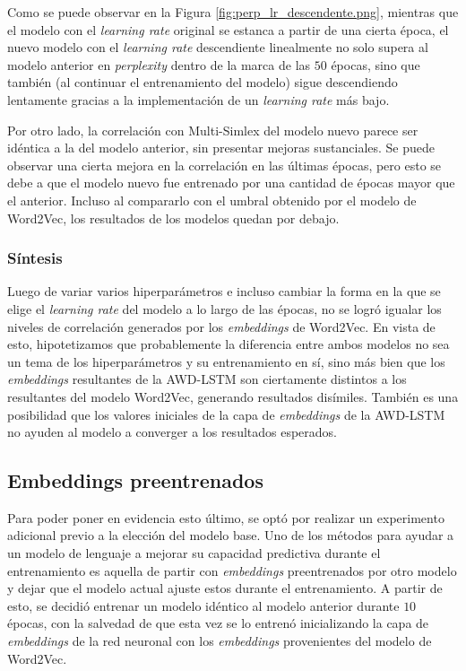 Como se puede observar en la Figura \ref{fig:perp_lr_descendente.png}, mientras que el modelo con el \textit{learning rate} 
original se estanca a partir de una cierta época, el nuevo modelo con el \textit{learning rate} descendiente 
linealmente no solo supera al modelo anterior en \textit{perplexity} dentro de la marca de las $50$ 
épocas, sino que también (al continuar el entrenamiento del modelo) sigue descendiendo 
lentamente gracias a la implementación de un \textit{learning rate} más bajo.

Por otro lado, la correlación con Multi-Simlex del modelo nuevo parece ser idéntica a 
la del modelo anterior, sin presentar mejoras sustanciales. Se puede observar una cierta 
mejora en la correlación en las últimas épocas, pero esto se debe a que el modelo 
nuevo fue entrenado por una cantidad de épocas mayor que el anterior. Incluso 
al compararlo con el umbral obtenido por el modelo de Word2Vec, los resultados 
de los modelos quedan por debajo.

\subsubsection{Síntesis}

Luego de variar varios hiperparámetros e incluso cambiar la forma en la que se elige 
el \textit{learning rate} del modelo a lo largo de las épocas, no se logró igualar los 
niveles de correlación generados por los \textit{embeddings} de Word2Vec. En vista de esto, 
hipotetizamos que probablemente la diferencia entre ambos modelos no sea un 
tema de los hiperparámetros y su entrenamiento en sí, sino más bien que los 
\textit{embeddings} resultantes de la AWD-LSTM son ciertamente distintos a los 
resultantes del modelo Word2Vec, generando resultados disímiles. También 
es una posibilidad que los valores iniciales de la capa de \textit{embeddings} 
de la AWD-LSTM no ayuden al modelo a converger a los resultados esperados.

\subsection{Embeddings preentrenados}

Para poder poner en evidencia esto último, se optó por realizar un experimento 
adicional previo a la elección del modelo base. Uno de los métodos para ayudar 
a un modelo de lenguaje a mejorar su capacidad predictiva durante el entrenamiento 
es aquella de partir con \textit{embeddings} preentrenados por otro modelo y dejar que 
el modelo actual ajuste estos durante el entrenamiento. \parencite{Wang2020}
A partir de esto, se decidió entrenar un modelo idéntico al modelo anterior 
durante $10$ épocas, con la salvedad de que esta vez se lo entrenó inicializando 
la capa de \textit{embeddings} de la red neuronal con los \textit{embeddings} provenientes 
del modelo de Word2Vec.

